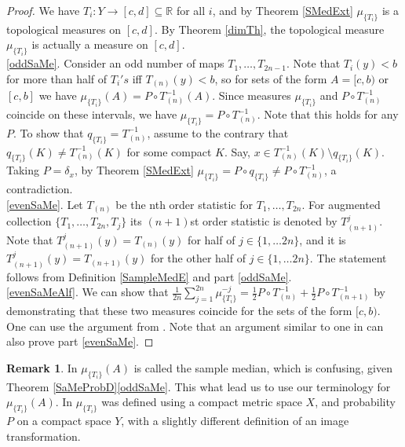 \documentclass[sn-mathphys-num]{sn-jnl}%
\theoremstyle{thmstyleone}%
\theoremstyle{definition}
\newtheorem{remark}[theorem]{Remark}
\begin{document}
\begin{proof}
We have $T_i : Y \longrightarrow [c,d] \subseteq \mathbb{R}$ for all $i$,  
and by Theorem \ref{SMedExt} $\mu_{\{T_i\}}$ is a topological measures on $[c,d]$. 
By Theorem \ref{dimTh},  the topological measure $ \mu_{\{T_i\} }$ is actually a measure on $[c,d]$. \\
\ref{oddSaMe}. Consider an odd number of maps $T_1, \ldots, T_{2n-1}$.
Note that $T_i(y) < b$ for more than half of $T_i's$ iff $T_{(n)}(y) < b$, so for sets of the form $A = [c, b)$ or $[c, b]$ 
we have $ \mu_{\{T_i\}}(A) = P \circ T_{(n)}^{-1}(A)$. 
Since measures $ \mu_{\{T_i\}}$ and $ P \circ T_{(n)}^{-1}$ coincide on these intervals,  we have $\mu_{\{T_i\}} =P \circ T_{(n)}^{-1}$. 
Note that this holds for any $P$.  To show that  $q_{\{T_i\}} = T_{(n)}^{-1}$, assume to the contrary that $q_{\{T_i\}} (K) \neq T_{(n)}^{-1} (K)$
for some compact $K$. Say, $x  \in T_{(n)}^{-1} (K) \setminus q_{\{T_i\}} (K) $. Taking $P = \delta_x$, 
by Theorem \ref{SMedExt} $\mu_{\{T_i\}} =P \circ q_{\{T_i\}}  \neq P \circ T_{(n)}^{-1}$, a contradiction. \\ 
\ref{evenSaMe}.
Let $T_{(n)}$ be the  nth order statistic for  $T_1, \ldots, T_{2n}$.
For augmented collection $\{ T_1, \ldots, T_{2n}, T_j \}$ its $(n+1)$st order statistic is denoted by  $T_{(n+1)}^j$. 
Note that 
$T_{(n+1)}^j(y) = T_{(n)} (y)$  for 
half of $j  \in \{1, \ldots 2n \}$, and it is $T_{(n+1)}^j(y) =T_{(n+1)} (y)$ for the other half of $j  \in \{1, \ldots 2n \}$. 
The statement follows from Definition \ref{SampleMedE} and part \ref{oddSaMe}. \\
\ref{evenSaMeAlf}.
We can show that 
$\frac{1}{2n} \sum_{j=1}^{2n}  \mu_{\{T_i\}}^{-j} = \frac12 P \circ T_{(n)}^{-1} + \frac12 P \circ T_{(n+1)}^{-1}$
by demonstrating that these two measures coincide for the sets of the form $[c, b)$. One can use the argument from \cite[Prop.23]{AlfMedian}.
Note that an argument similar to one in \cite[Prop.23]{AlfMedian}  can also prove part \ref{evenSaMe}. 
\end{proof} 

\begin{remark}
In \cite{AlfMedian} $ \mu_{\{T_i\}}(A)$ is called the sample median, which is confusing, given Theorem \ref{SaMeProbD}\ref{oddSaMe}.
This what lead us to use our terminology for  $ \mu_{\{T_i\}}(A)$. In  \cite{AlfMedian}   $\mu_{\{T_i\}}$ was defined using a compact metric space $X$, and  
probability $P$ on a compact space $Y$, with a slightly different definition of an image transformation.   
\end{remark} 
\end{document}
